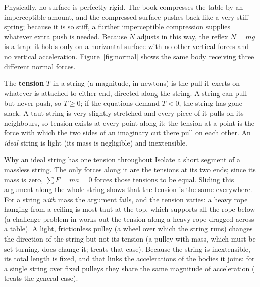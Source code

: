 \begin{figure}[htbp]
\centering
{}
\end{figure}

Physically, no surface is perfectly rigid. The book compresses the table by an imperceptible amount, and
the compressed surface pushes back like a very stiff spring; because it is so stiff, a further
imperceptible compression supplies whatever extra push is needed. Because $N$ adjusts in this way, the
reflex $N=mg$ is a trap: it holds only on a horizontal surface with no other vertical forces and no
vertical acceleration. Figure~\ref{fig:normal} shows the same body receiving three different normal forces.

The \textbf{tension} $T$ in a string (a magnitude, in newtons) is the pull it exerts on whatever is attached to either end,
directed along the string. A string can pull but never push, so $T\ge0$; if the equations demand $T<0$,
the string has gone slack. A taut string is very slightly stretched and every piece of it pulls on its
neighbours, so tension exists at every point along it: the tension at a point is the force with which
the two sides of an imaginary cut there pull on each other. An \emph{ideal} string is light (its mass is
negligible) and inextensible.

\begin{derivbox}{Why an ideal string has one tension throughout}
Isolate a short segment of a massless string. The only forces along it are the tensions at its two ends;
since its mass is zero, $\sum F=ma=0$ forces those tensions to be equal. Sliding this argument along the
whole string shows that the tension is the same everywhere. For a string \emph{with} mass the argument
fails, and the tension varies: a heavy rope hanging from a ceiling is most taut at the top, which
supports all the rope below (a challenge problem in  works out the tension along a heavy rope dragged across a table). A light, frictionless pulley (a wheel over which the string runs) changes the
direction of the string but not its tension (a pulley with mass, which must be set turning, does change it;  treats that case). Because the string is inextensible, its total length is fixed, and
that links the accelerations of the bodies it joins: for a single string over fixed pulleys they share
the same magnitude of acceleration ( treats the general case).
\end{derivbox}

